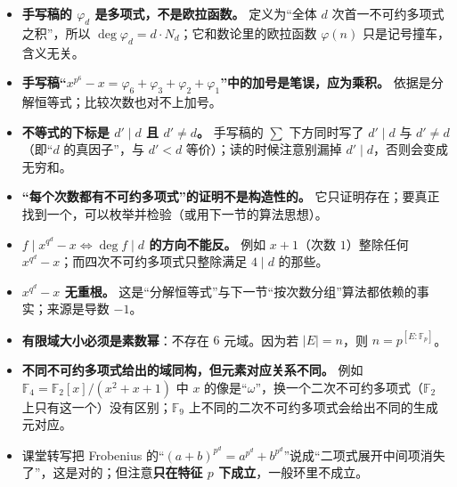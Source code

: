 \begin{itemize}
\item \textbf{手写稿的 $\varphi_d$ 是多项式，不是欧拉函数。} 定义为“全体 $d$ 次首一不可约多项式之积”，所以 $\deg\varphi_d=d\cdot N_d$；它和数论里的欧拉函数 $\varphi(n)$ 只是记号撞车，含义无关。
\item \textbf{手写稿“$x^{p^6}-x=\varphi_6+\varphi_3+\varphi_2+\varphi_1$”中的加号是笔误，应为乘积。} 依据是分解恒等式；比较次数也对不上加号。
\item \textbf{不等式的下标是 $d'\mid d$ 且 $d'\ne d$。} 手写稿的 $\sum$ 下方同时写了 $d'\mid d$ 与 $d'\ne d$（即“$d$ 的真因子”，与 $d'<d$ 等价）；读的时候注意别漏掉 $d'\mid d$，否则会变成无穷和。
\item \textbf{“每个次数都有不可约多项式”的证明不是构造性的。} 它只证明存在；要真正找到一个，可以枚举并检验（或用下一节的算法思想）。
\item \textbf{$f\mid x^{q^d}-x\iff\deg f\mid d$ 的方向不能反。} 例如 $x+1$（次数 $1$）整除任何 $x^{q^d}-x$；而四次不可约多项式只整除满足 $4\mid d$ 的那些。
\item \textbf{$x^{q^d}-x$ 无重根。} 这是“分解恒等式”与下一节“按次数分组”算法都依赖的事实；来源是导数 $-1$。
\item \textbf{有限域大小必须是素数幂}：不存在 $6$ 元域。因为若 $|E|=n$，则 $n=p^{[E:\mathbb F_p]}$。
\item \textbf{不同不可约多项式给出的域同构，但元素对应关系不同。} 例如 $\mathbb F_4=\mathbb F_2[x]/(x^2+x+1)$ 中 $x$ 的像是“$\omega$”，换一个二次不可约多项式（$\mathbb F_2$ 上只有这一个）没有区别；$\mathbb F_9$ 上不同的二次不可约多项式会给出不同的生成元对应。
\item 课堂转写把 Frobenius 的“$(a+b)^{p^d}=a^{p^d}+b^{p^d}$”说成“二项式展开中间项消失了”，这是对的；但注意\textbf{只在特征 $p$ 下成立}，一般环里不成立。
\end{itemize}
